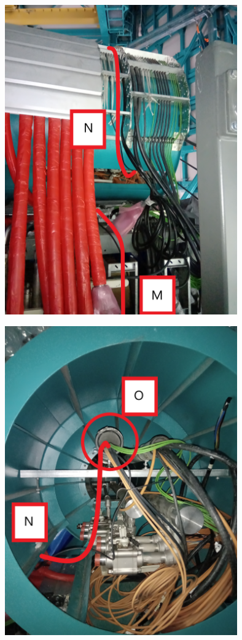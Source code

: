 \begin{figure}
  \centering
  \includegraphics[width=10cm]{images/28.jpg}
\end{figure}


\begin{figure}
  \centering
  \includegraphics[width=10cm]{images/28-1.jpg}
\end{figure}

